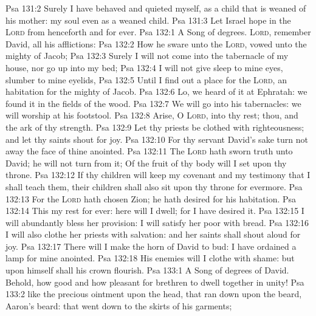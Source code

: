 \vs Psa 131:2 Surely I have behaved and quieted myself, as a child that is weaned of his mother: my soul  even as a weaned child.
\vs Psa 131:3 Let Israel hope in the \textsc{Lord} from henceforth and for ever.
\vs Psa 132:1 A Song of degrees. \textsc{Lord}, remember David,  all his afflictions:
\vs Psa 132:2 How he sware unto the \textsc{Lord},  vowed unto the mighty  of Jacob;
\vs Psa 132:3 Surely I will not come into the tabernacle of my house, nor go up into my bed;
\vs Psa 132:4 I will not give sleep to mine eyes,  slumber to mine eyelids,
\vs Psa 132:5 Until I find out a place for the \textsc{Lord}, an habitation for the mighty  of Jacob.
\vs Psa 132:6 Lo, we heard of it at Ephratah: we found it in the fields of the wood.
\vs Psa 132:7 We will go into his tabernacles: we will worship at his footstool.
\vs Psa 132:8 Arise, O \textsc{Lord}, into thy rest; thou, and the ark of thy strength.
\vs Psa 132:9 Let thy priests be clothed with righteousness; and let thy saints shout for joy.
\vs Psa 132:10 For thy servant David's sake turn not away the face of thine anointed.
\vs Psa 132:11 The \textsc{Lord} hath sworn  truth unto David; he will not turn from it; Of the fruit of thy body will I set upon thy throne.
\vs Psa 132:12 If thy children will keep my covenant and my testimony that I shall teach them, their children shall also sit upon thy throne for evermore.
\vs Psa 132:13 For the \textsc{Lord} hath chosen Zion; he hath desired  for his habitation.
\vs Psa 132:14 This  my rest for ever: here will I dwell; for I have desired it.
\vs Psa 132:15 I will abundantly bless her provision: I will satisfy her poor with bread.
\vs Psa 132:16 I will also clothe her priests with salvation: and her saints shall shout aloud for joy.
\vs Psa 132:17 There will I make the horn of David to bud: I have ordained a lamp for mine anointed.
\vs Psa 132:18 His enemies will I clothe with shame: but upon himself shall his crown flourish.
\vs Psa 133:1 A Song of degrees of David. Behold, how good and how pleasant  for brethren to dwell together in unity!
\vs Psa 133:2  like the precious ointment upon the head, that ran down upon the beard,  Aaron's beard: that went down to the skirts of his garments;
